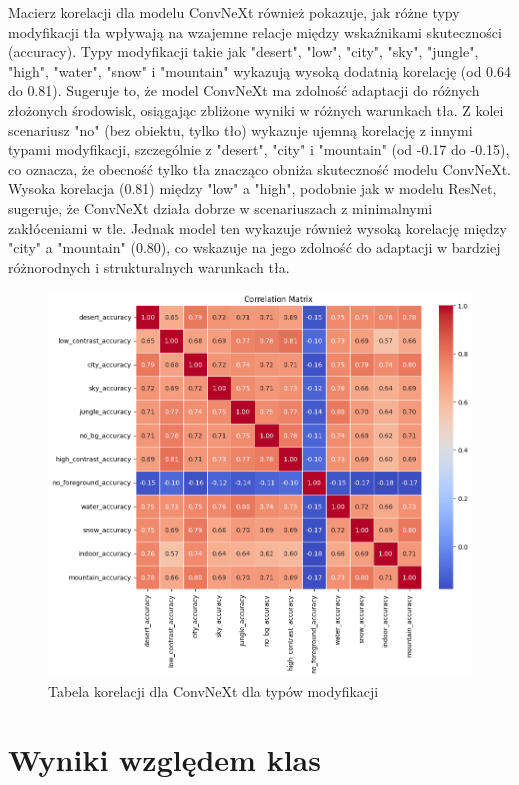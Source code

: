 Macierz korelacji dla modelu ConvNeXt również pokazuje, jak różne typy modyfikacji 
tła wpływają na wzajemne relacje między wskaźnikami skuteczności (accuracy). 
Typy modyfikacji takie jak "desert", "low", "city", "sky", "jungle", "high", "water", 
"snow" i "mountain" wykazują wysoką dodatnią korelację (od 0.64 do 0.81). 
Sugeruje to, że model ConvNeXt ma zdolność adaptacji do różnych złożonych środowisk, 
osiągając zbliżone wyniki w różnych warunkach tła. Z kolei scenariusz "no" 
(bez obiektu, tylko tło) wykazuje ujemną korelację z innymi typami modyfikacji, 
szczególnie z "desert", "city" i "mountain" (od -0.17 do -0.15), co oznacza, że 
obecność tylko tła znacząco obniża skuteczność modelu ConvNeXt. Wysoka korelacja 
(0.81) między "low" a "high", podobnie jak w modelu ResNet, sugeruje, że ConvNeXt 
działa dobrze w scenariuszach z minimalnymi zakłóceniami w tle. Jednak model ten 
wykazuje również wysoką korelację między "city" a "mountain" (0.80), co wskazuje na 
jego zdolność do adaptacji w bardziej różnorodnych i strukturalnych warunkach tła.

\begin{figure}
	\centering\includegraphics[width=.9\textwidth]{img/korelacja_convnext_typ}
	\caption{Tabela korelacji dla ConvNeXt dla typów modyfikacji}  
    \label{rys:corelation_convnext_type}
\end{figure}

\section*{Wyniki względem klas}


